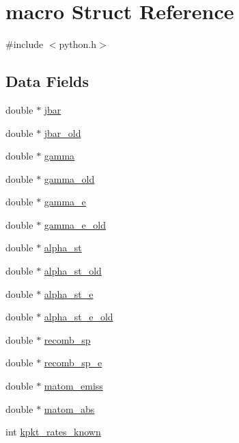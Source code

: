 \hypertarget{structmacro}{}\section{macro Struct Reference}
\label{structmacro}


{\ttfamily \#include $<$python.\+h$>$}

\subsection*{Data Fields}
\begin{DoxyCompactItemize}
\item 
double $\ast$ \hyperlink{structmacro_ae726f77ad64bda6f946406ee648bfeb7}{jbar}
\item 
double $\ast$ \hyperlink{structmacro_a517e7721172c08c80b4f8a1b20274385}{jbar\+\_\+old}
\item 
double $\ast$ \hyperlink{structmacro_acc6db9c38b22c6e664567d2a46b9b3aa}{gamma}
\item 
double $\ast$ \hyperlink{structmacro_ae6d7a0a034aa6e4b67b5a379fc599b4d}{gamma\+\_\+old}
\item 
double $\ast$ \hyperlink{structmacro_a594afc421f440fb2cab4b3a8ef59f582}{gamma\+\_\+e}
\item 
double $\ast$ \hyperlink{structmacro_a748f4ad8b68b49d60c73644b4882ab70}{gamma\+\_\+e\+\_\+old}
\item 
double $\ast$ \hyperlink{structmacro_a0e9447fef9f2b3b67cf7ca5a8d8dc4e9}{alpha\+\_\+st}
\item 
double $\ast$ \hyperlink{structmacro_adc584bf7d87a213e34b03a3631078c4d}{alpha\+\_\+st\+\_\+old}
\item 
double $\ast$ \hyperlink{structmacro_ae3484a034eeddcfd15b61073421412ab}{alpha\+\_\+st\+\_\+e}
\item 
double $\ast$ \hyperlink{structmacro_aaeec36e5a5ced5d7d0e8e4619e8f7cb7}{alpha\+\_\+st\+\_\+e\+\_\+old}
\item 
double $\ast$ \hyperlink{structmacro_aa33a4e57be212a9a8f49edf6660350cb}{recomb\+\_\+sp}
\item 
double $\ast$ \hyperlink{structmacro_a13217cd83bb2aff404860f1eea75d18e}{recomb\+\_\+sp\+\_\+e}
\item 
double $\ast$ \hyperlink{structmacro_af1f77da4f0d619ccdf0721133c93a5e8}{matom\+\_\+emiss}
\item 
double $\ast$ \hyperlink{structmacro_a5a30021fa093059f407675bfde840b34}{matom\+\_\+abs}
\item 
int \hyperlink{structmacro_a22a281cdcc628db94cb49e1596802c2f}{kpkt\+\_\+rates\+\_\+known}

\end{DoxyCompactItemize}
